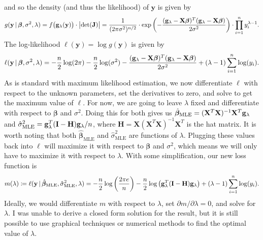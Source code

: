 \documentclass[10pt]{article}
\begin{document}
and so the density (and thus the likelihood) of \(\mathbf{y}\) is given by 
\begin{align*}
    g(\mathbf{y} \,|\, \bm{\beta}, \sigma^2, \lambda)
    = f \big( \mathbf{g}_{\lambda}(\mathbf{y}) \big) \cdot \big|\mathrm{det}(\mathbf{J})\big|
    = \frac{1}{(2\pi\sigma^2)^{n/2}} \cdot \mathrm{exp} \left( - \frac{(\mathbf{g}_{\lambda} - \mathbf{X}\bm{\beta})^T (\mathbf{g}_{\lambda} - \mathbf{X}\bm{\beta})}{2 \sigma^2} \right) \cdot \prod_{i=1}^n y_i^{\lambda - 1}.
\end{align*}
The log-likelihood \(\ell(\mathbf{y}) = \log g(\mathbf{y})\) is given by 
\begin{align*}
    \ell(\mathbf{y} \,|\, \bm{\beta}, \sigma^2, \lambda) 
    = - \frac{n}{2} \log (2\pi) - \frac{n}{2} \log (\sigma^2) - \frac{(\mathbf{g}_{\lambda} - \mathbf{X}\bm{\beta})^T (\mathbf{g}_{\lambda} - \mathbf{X}\bm{\beta})}{2 \sigma^2} + (\lambda - 1) \sum_{i=1}^n \log (y_i).
\end{align*}
As is standard with maximum likelihood estimation, we now differentiate \(\ell\) with respect to the unknown parameters, set the derivatives to zero, and solve to get the maximum value of \(\ell\). 
For now, we are going to leave \(\lambda\) fixed and differentiate with respect to \(\bm{\beta}\) and \(\sigma^2\). Doing this for both gives us 
\(\hat{\bm{\beta}}_{\mathrm{MLE}} = (\mathbf{X}^T\mathbf{X})^{-1}\mathbf{X}^T\mathbf{g}_{\lambda}\) and \(\hat{\sigma}^2_{\mathrm{MLE}} = \mathbf{g}_{\lambda}^T (\mathbf{I} - \mathbf{H}) \mathbf{g}_{\lambda} / n\), where 
\(\mathbf{H} = \mathbf{X}(\mathbf{X}^T\mathbf{X})^{-1}\mathbf{X}^T\) is the hat matrix. 
It is worth noting that both \(\hat{\bm{\beta}}_{\mathrm{MLE}}\) and \(\hat{\sigma}^2_{\mathrm{MLE}}\) are functions of \(\lambda\). 
Plugging these values back into \(\ell\) will maximize it with respect to \(\bm{\beta}\) and \(\sigma^2\), 
which means we will only have to maximize it with respect to \(\lambda\). 
With some simplification, our new loss function is 
\begin{align*}
    m(\lambda)
    \coloneqq \ell(\mathbf{y} \,|\, \hat{\bm{\beta}}_{\mathrm{MLE}}, \hat{\sigma}^2_{\mathrm{MLE}}, \lambda)
    = - \frac{n}{2} \log \left( \frac{2 \pi e}{n} \right) - \frac{n}{2} \log \big( \mathbf{g}_{\lambda}^T(\mathbf{I} - \mathbf{H}) \mathbf{g}_{\lambda} \big) + (\lambda - 1) \sum_{i=1}^n \log(y_i).
\end{align*}
Ideally, we would differentiate \(m\) with respect to \(\lambda\), set \(\partial m / \partial \lambda = 0\), and solve for \(\lambda\). I was unable to 
derive a closed form solution for the result, but it is still possible to use graphical techniques or numerical methods to find the optimal value of \(\lambda\). 
\end{document}
